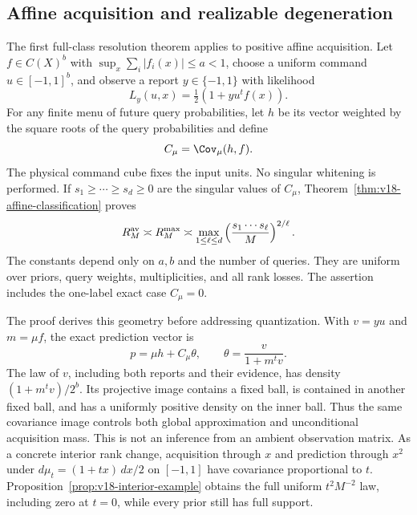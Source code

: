 \documentclass[11pt]{amsart}
\theoremstyle{definition}\newtheorem{definition}[theorem]{Definition}
\theoremstyle{remark}\newtheorem{remark}[theorem]{Remark}
\begin{document}
\subsection{Affine acquisition and realizable degeneration}

The first full-class resolution theorem applies to positive affine
acquisition. Let $f\in C(X)^b$ with
$\sup_x\sum_i|f_i(x)|\le a<1$, choose a uniform command
$u\in[-1,1]^b$, and observe a report $y\in\{-1,1\}$ with likelihood
\[
 L_y(u,x)=\tfrac12(1+y u^tf(x)).
\]
For any finite menu of future query probabilities, let $h$ be its vector
weighted by the square roots of the query probabilities and define
\[
 C_\mu=\Cov_\mu(h,f).
\]
The physical command cube fixes the input units. No singular whitening
is performed. If $s_1\ge\cdots\ge s_d\ge0$ are the singular values
of $C_\mu$, Theorem~\ref{thm:v18-affine-classification} proves
\[
 R_M^{\rm av}\asymp R_M^{\rm max}\asymp
 \max_{1\le\ell\le d}
      \left(\frac{s_1\cdots s_\ell}{M}\right)^{2/\ell}.
\]
The constants depend only on $a,b$ and the number of queries. They are
uniform over priors, query weights, multiplicities, and all rank losses.
The assertion includes the one-label exact case $C_\mu=0$.

The proof derives this geometry before addressing quantization. With
$v=yu$ and $m=\mu f$, the exact prediction vector is
\[
 p=\mu h+C_\mu\theta,\qquad
 \theta=\frac{v}{1+m^tv}.
\]
The law of $v$, including both reports and their evidence, has density
$(1+m^tv)/2^b$. Its projective image contains a fixed ball, is contained
in another fixed ball, and has a uniformly positive density on the
inner ball. Thus the same covariance image controls both global
approximation and unconditional acquisition mass. This is not an
inference from an ambient observation matrix. As a concrete interior
rank change, acquisition through $x$ and prediction through $x^2$ under
$d\mu_t=(1+tx)\,dx/2$ on $[-1,1]$ have covariance proportional to
$t$. Proposition~\ref{prop:v18-interior-example} obtains the full
uniform $t^2M^{-2}$ law, including zero at $t=0$, while every prior
still has full support.
\end{document}
